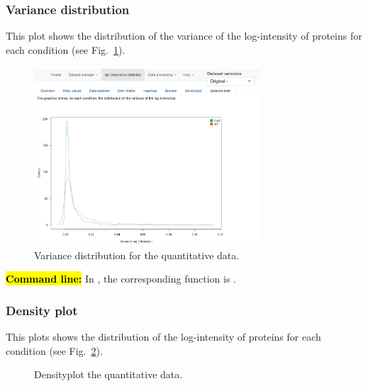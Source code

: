 \documentclass[12pt]{article}
\begin{document}
\subsubsection{Variance distribution}
This plot shows the distribution of the variance of the log-intensity of proteins for each condition (see Fig.~\ref{fig:sdvd}).

\begin {figure}
\centering
\includegraphics[width=0.75\textwidth]{images/desc_varDist.png}
\caption{Variance distribution for the quantitative data.}\label{fig:sdvd}
\end {figure}

\hl{\bf Command line:} In , the corresponding function is .

\subsubsection{Density plot}\label{sec:densityplot}
This plots shows the distribution of the log-intensity of proteins for each condition (see Fig.~\ref{fig:sddp}).

\begin {figure}
\centering
{}
\caption{Densityplot the quantitative data.}\label{fig:sddp}
\end {figure}
\end{document}

